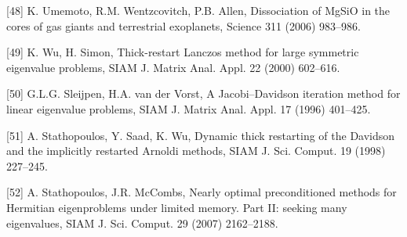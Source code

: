 \documentclass[
  10
]{article}
\begin{document}
{[}48{]} K. Umemoto, R.M. Wentzcovitch, P.B. Allen, Dissociation of
MgSiO in the cores of gas giants and terrestrial exoplanets, Science 311
(2006) 983--986.

{[}49{]} K. Wu, H. Simon, Thick-restart Lanczos method for large
symmetric eigenvalue problems, SIAM J. Matrix Anal. Appl. 22 (2000)
602--616.

{[}50{]} G.L.G. Sleijpen, H.A. van der Vorst, A Jacobi--Davidson
iteration method for linear eigenvalue problems, SIAM J. Matrix Anal.
Appl. 17 (1996) 401--425.

{[}51{]} A. Stathopoulos, Y. Saad, K. Wu, Dynamic thick restarting of
the Davidson and the implicitly restarted Arnoldi methods, SIAM J. Sci.
Comput. 19 (1998) 227--245.

{[}52{]} A. Stathopoulos, J.R. McCombs, Nearly optimal preconditioned
methods for Hermitian eigenproblems under limited memory. Part II:
seeking many eigenvalues, SIAM J. Sci. Comput. 29 (2007) 2162--2188.
\end{document}
